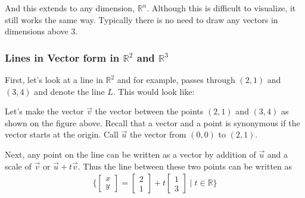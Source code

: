 And this extends to any dimension, $\mathbb{R}^n$.  Although this is difficult to visualize, it still works the same way.  Typically there is no need to draw any vectors in dimensions above 3.

\subsubsection{Lines in Vector form in $\mathbb{R}^2$ and $\mathbb{R}^3$}

First, let's look at a line in $\mathbb{R}^2$ and for example, passes through $(2,1)$ and $(3,4)$ and denote the line $L$. This would look like:
%
\begin{center}
\end{center}

Let's make the vector $\vec{v}$ the vector between the points $(2,1)$ and $(3,4)$ as shown on the figure above.  Recall that a vector and a point is synonymous if the vector starts at the origin.  Call $\vec{u}$ the vector from $(0,0)$ to $(2,1)$.

Next, any point on the line can be written as a vector by addition of $\vec{u}$ and a scale of $\vec{v}$ or $\vec{u}+t\vec{v}$.  Thus the line between these two points can be written as
%
\begin{align*}
\{
\begin{bmatrix}
x \\ y
\end{bmatrix} =
\begin{bmatrix}
2 \\ 1
\end{bmatrix} + t
\begin{bmatrix}
1 \\ 3
\end{bmatrix} \; | \; t \in \mathbb{R} \}
\end{align*}

